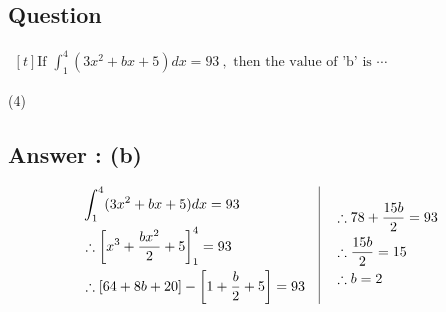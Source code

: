\documentclass[17pt]{extarticle}
\begin{document}
\begin{fleqn}
\section{Question} 

$\begin{aligned}[t] 
\text{If \ } \int_{1}^{4} (3x^2 + bx + 5) dx = 93\ , \text{ then the value of 'b' is } \cdots
\end{aligned}$

\begin{tasks}(4)
  \task {}
\end{tasks}
\subsection*{Answer : (b)}
\begin{equation} \nonumber
\begin{alignedat}{4}
& \int_{1}^{4} (3x^2 + bx + 5) dx = 93\\
& \therefore \left[ x^3 +\frac{bx^2}{2}+5\right]_{1}^{4} = 93\\
& \therefore [64+8b+20] - \left[ 1 + \frac{b}{2} + 5\right]=93\\
\end{alignedat}
\quad
\vrule
\quad
\begin{alignedat}{4}
& \therefore 78+\frac{15b}{2} = 93\\
& \therefore \frac{15b}{2} = 15\\
& \therefore b=2\\
\end{alignedat}
\end{equation}


\end{fleqn}
\end{document}
